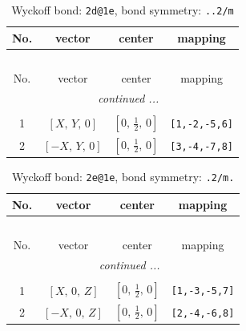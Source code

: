 \documentclass[fleqn,8pt]{jsarticle}
\begin{document}
\renewcommand{\arraystretch}{1.2}
\begin{longtable}{cccc}
\caption{Wyckoff bond: {\tt 2d@1e}, bond symmetry: {\tt ..2/m}}
 \\
 \hline \hline
No. & vector & center & mapping \\ \hline \endfirsthead

\multicolumn{3}{l}{\tablename\ \thetable{}} \\
 \hline \hline
No. & vector & center & mapping \\ \hline \endhead

 \hline \hline
\multicolumn{3}{r}{\footnotesize\it continued ...} \\ \endfoot

 \hline \hline
\multicolumn{3}{r}{} \\ \endlastfoot

1 & $\left[ X,\, Y,\, 0 \right]$ & $\left[ 0,\, \frac{1}{2},\, 0 \right]$ & {\tt [1,-2,-5,6]} \\ \hline
2 & $\left[ - X,\, Y,\, 0 \right]$ & $\left[ 0,\, \frac{1}{2},\, 0 \right]$ & {\tt [3,-4,-7,8]} \\
\end{longtable}
\renewcommand{\arraystretch}{1.2}
\begin{longtable}{cccc}
\caption{Wyckoff bond: {\tt 2e@1e}, bond symmetry: {\tt .2/m.}}
 \\
 \hline \hline
No. & vector & center & mapping \\ \hline \endfirsthead

\multicolumn{3}{l}{\tablename\ \thetable{}} \\
 \hline \hline
No. & vector & center & mapping \\ \hline \endhead

 \hline \hline
\multicolumn{3}{r}{\footnotesize\it continued ...} \\ \endfoot

 \hline \hline
\multicolumn{3}{r}{} \\ \endlastfoot

1 & $\left[ X,\, 0,\, Z \right]$ & $\left[ 0,\, \frac{1}{2},\, 0 \right]$ & {\tt [1,-3,-5,7]} \\ \hline
2 & $\left[ - X,\, 0,\, Z \right]$ & $\left[ 0,\, \frac{1}{2},\, 0 \right]$ & {\tt [2,-4,-6,8]} \\
\end{longtable}
\renewcommand{\arraystretch}{1.2}
\end{document}
